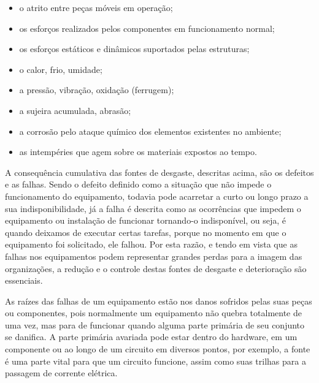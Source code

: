 \begin{itemize}
	\item o atrito entre peças móveis em operação;
	\item os esforços realizados pelos componentes em funcionamento normal;
	\item os esforços estáticos e dinâmicos suportados pelas estruturas;
	\item o calor, frio, umidade;
	\item a pressão, vibração, oxidação (ferrugem);
	\item a sujeira acumulada, abrasão;
	\item a corrosão pelo ataque químico dos elementos existentes no ambiente;
	\item as intempéries que agem sobre os materiais expostos ao tempo.
\end{itemize}


A consequência cumulativa das fontes de desgaste, descritas acima, são os defeitos e as falhas. Sendo o defeito definido como a situação que não impede o funcionamento do equipamento, todavia pode acarretar a curto ou longo prazo a sua indisponibilidade, já a falha é descrita como as ocorrências que impedem o equipamento ou instalação de funcionar tornando-o indisponível, ou seja, é quando deixamos de executar certas tarefas, porque no momento em que o equipamento foi solicitado, ele falhou. Por esta razão, e tendo em vista que as falhas nos equipamentos podem representar grandes perdas para a imagem das organizações, a redução e o controle destas fontes de desgaste e deterioração são essenciais.

As raízes das falhas de um equipamento estão nos danos sofridos pelas suas peças ou componentes, pois normalmente um equipamento não quebra totalmente de uma vez, mas para de funcionar quando alguma parte primária de seu conjunto se danifica. A parte primária avariada pode estar dentro do hardware, em um componente ou ao longo de um circuito em diversos pontos, por exemplo, a fonte é uma parte vital para que um circuito funcione, assim como suas trilhas para a passagem de corrente elétrica.

